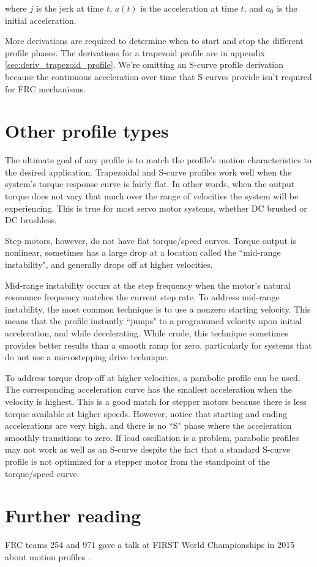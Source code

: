 where $j$ is the jerk at time $t$, $a(t)$ is the acceleration at time $t$, and
$a_0$ is the initial acceleration.

More derivations are required to determine when to start and stop the different
profile phases. The derivations for a trapezoid profile are in appendix
\ref{sec:deriv_trapezoid_profile}. We're omitting an S-curve profile derivation
because the continuous acceleration over time that S-curves provide isn't
required for FRC mechanisms.

\section{Other profile types}

The ultimate goal of any profile is to match the profile's motion
characteristics to the desired application. Trapezoidal and S-curve profiles
work well when the \gls{system}'s torque response curve is fairly flat. In other
words, when the output torque does not vary that much over the range of
velocities the \gls{system} will be experiencing. This is true for most servo
motor systems, whether DC brushed or DC brushless.

Step motors, however, do not have flat torque/speed curves. Torque output is
nonlinear, sometimes has a large drop at a location called the ``mid-range
instability", and generally drops off at higher velocities.

Mid-range instability occurs at the step frequency when the motor's natural
resonance frequency matches the current step rate. To address mid-range
instability, the most common technique is to use a nonzero starting velocity.
This means that the profile instantly ``jumps" to a programmed velocity upon
initial acceleration, and while decelerating. While crude, this technique
sometimes provides better results than a smooth ramp for zero, particularly for
\glspl{system} that do not use a microstepping drive technique.

To address torque drop-off at higher velocities, a parabolic profile can be
used. The corresponding acceleration curve has the smallest acceleration when
the velocity is highest. This is a good match for stepper motors because there
is less torque available at higher speeds. However, notice that starting and
ending accelerations are very high, and there is no ``S" phase where the
acceleration smoothly transitions to zero. If load oscillation is a problem,
parabolic profiles may not work as well as an S-curve despite the fact that a
standard S-curve profile is not optimized for a stepper motor from the
standpoint of the torque/speed curve.

\section{Further reading}

FRC teams 254 and 971 gave a talk at FIRST World Championships in 2015 about
motion profiles \cite{bib:motion_profiles}.

